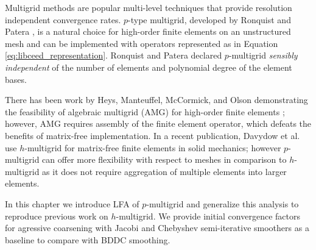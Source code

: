 Multigrid methods are popular multi-level techniques that provide resolution independent convergence rates.
$p$-type multigrid, developed by Ronquist and Patera \cite{ronquist1987spectral}, is a natural choice for high-order finite elements on an unstructured mesh and can be implemented with operators represented as in Equation \ref{eq:libceed_representation}.
Ronquist and Patera declared $p$-multigrid \textit{sensibly independent} of the number of elements and polynomial degree of the element bases.

There has been work by Heys, Manteuffel, McCormick, and Olson demonstrating the feasibility of algebraic multigrid (AMG) for high-order finite elements \cite{heys2005algebraic}; however, AMG requires assembly of the finite element operator, which defeats the benefits of matrix-free implementation.
In a recent publication, Davydow et al. use $h$-multigrid for matrix-free finite elements in solid mechanics; however $p$-multigrid can offer more flexibility with respect to meshes in comparison to $h$-multigrid as it does not require aggregation of multiple elements into larger elements.

In this chapter we introduce LFA of $p$-multigrid and generalize this analysis to reproduce previous work on $h$-multigrid.
We provide initial convergence factors for agressive coarsening with Jacobi and Chebyshev semi-iterative smoothers as a baseline to compare with BDDC smoothing.
